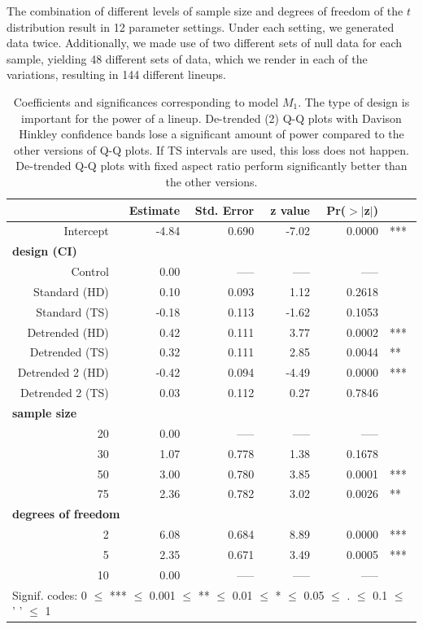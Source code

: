 \documentclass{article}\usepackage[]{graphicx}\usepackage[]{color}
\begin{document}
\begin{appendix}
%
The combination of different levels of sample size and degrees of freedom of the $t$ distribution result in 12 parameter settings. Under each setting, we  generated data twice. Additionally, we made use of two different sets of null data for each sample, yielding 48 different sets of data, which we render in each of the variations, resulting in 144 different lineups. 


\begin{table}[ht]
\centering
\caption{\label{tab:model} Coefficients and significances corresponding to  model $M_1$. The type of design is important for the power of a lineup. De-trended (2) Q-Q plots with Davison Hinkley confidence bands lose a significant amount of power compared to the other  versions of Q-Q plots. If TS intervals are used, this loss does not happen. De-trended Q-Q plots with fixed aspect ratio perform significantly better than the other versions.}
\begin{tabular}{rrrrrl}
   \hline
  &\bf Estimate &\bf Std. Error &\bf z value &\bf Pr($>$$|$z$|$) & \\ 
   \hline
    Intercept & -4.84 & 0.690 & -7.02 & 0.0000 & ***\\ 
 \multicolumn{3}{l}{\bf design (CI)} \\
   Control & 0.00 & ----- & ----- & ----- \\ [2pt]
   Standard (HD) & 0.10 & 0.093 & 1.12 & 0.2618 \\ 
   Standard (TS) & -0.18 & 0.113 & -1.62 & 0.1053 \\ [2pt]
   Detrended (HD) & 0.42 & 0.111 & 3.77 & 0.0002 & ***\\ 
   Detrended (TS) & 0.32 & 0.111 & 2.85 & 0.0044 & **\\ [2pt]
   Detrended 2 (HD) & -0.42 & 0.094 & -4.49 & 0.0000 & ***\\ 
   Detrended 2 (TS) & 0.03 & 0.112 & 0.27 & 0.7846 \\ [3pt]
 \multicolumn{3}{l}{\bf sample size} \\
   20 & 0.00 & ----- & ----- & ----- \\ 
   30 & 1.07 & 0.778 & 1.38 & 0.1678 \\ 
   50 & 3.00 & 0.780 & 3.85 & 0.0001 & ***\\ 
   75 & 2.36 & 0.782 & 3.02 & 0.0026 & **\\ [3pt]
 \multicolumn{3}{l}{\bf degrees of freedom} \\
  2 & 6.08 & 0.684 & 8.89 & 0.0000 & ***\\ 
  5 & 2.35 & 0.671 & 3.49 & 0.0005 & ***\\ 
  10 & 0.00 & ----- & ----- & ----- \\ 
    \hline
\multicolumn{6}{l}{Signif. codes:  0 $\le$ *** $\le$ 0.001 $\le$ ** $\le$ 0.01 $\le$ * $\le$ 0.05 $\le$ . $\le$ 0.1 $\le$ ' ' $\le$ 1}
\end{tabular}
\end{table}


\end{appendix}
\end{document}

